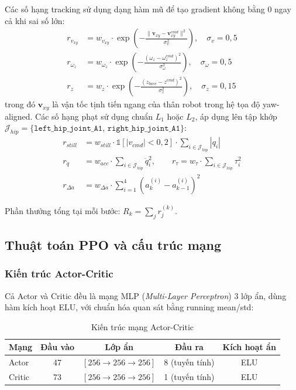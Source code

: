 Các số hạng tracking sử dụng dạng hàm mũ để tạo gradient không bằng 0
ngay cả khi sai số lớn:
\begin{align}
    r_{v_{xy}} &= w_{v_{xy}} \cdot
        \exp\!\left(-\frac{\|\mathbf{v}_{xy} - \mathbf{v}_{xy}^{cmd}\|^2}{\sigma_{v}^2}\right),
    \quad \sigma_v = 0{,}5
    \label{eq:rew_linvel} \\
    r_{\omega_z} &= w_{\omega_z} \cdot
        \exp\!\left(-\frac{(\omega_z - \omega_z^{cmd})^2}{\sigma_\omega^2}\right),
    \quad \sigma_\omega = 0{,}5
    \label{eq:rew_angvel} \\
    r_{z} &= w_z \cdot
        \exp\!\left(-\frac{(z_{base} - z^{cmd})^2}{\sigma_z^2}\right),
    \quad \sigma_z = 0{,}15
    \label{eq:rew_height}
\end{align}
trong đó $\mathbf{v}_{xy}$ là vận tốc tịnh tiến ngang của thân robot trong
hệ tọa độ yaw-aligned. Các số hạng phạt sử dụng chuẩn $L_1$ hoặc $L_2$, áp dụng lên tập khớp
$\mathcal{J}_{hip} = \{\texttt{left\_hip\_joint\_A1},\,\texttt{right\_hip\_joint\_A1}\}$:
\begin{align}
    r_{still}    &= w_{still} \cdot
        \mathbb{1}[|v_{cmd}| < 0{,}2]\cdot
        \sum_{i \in \mathcal{J}_{hip}} |q_i|
    \label{eq:rew_still} \\
    r_{\ddot{q}} &= w_{acc} \cdot \sum_{i \in \mathcal{J}_{hip}} \ddot{q}_i^2,
    \qquad
    r_{\tau}     = w_{\tau} \cdot \sum_{i \in \mathcal{J}_{hip}} \tau_i^2
    \label{eq:rew_acc_torque} \\
    r_{\Delta a} &= w_{\Delta a} \cdot \sum_{i=1}^{4}(a_k^{(i)} - a_{k-1}^{(i)})^2
    \label{eq:rew_action_rate}
\end{align}

Phần thưởng tổng tại mỗi bước: $R_k = \sum_j r_j^{(k)}$.

\subsection{Thuật toán PPO và cấu trúc mạng}

\subsubsection{Kiến trúc Actor-Critic}

Cả Actor và Critic đều là mạng MLP (\textit{Multi-Layer Perceptron}) 3 lớp
ẩn, dùng hàm kích hoạt ELU, với chuẩn hóa quan sát bằng running mean/std:

\begin{table}[H]
    \centering
    \caption{Kiến trúc mạng Actor-Critic}
    \label{tab:network_arch}
    \renewcommand{\arraystretch}{1.3}
    \begin{tabular}{|l|c|c|c|c|}
    \hline
    \textbf{Mạng} & \textbf{Đầu vào} & \textbf{Lớp ẩn} & \textbf{Đầu ra} & \textbf{Kích hoạt ẩn} \\
    \hline
    Actor  & 47  & $[256 \to 256 \to 256]$ & 8 (tuyến tính) & ELU \\
    Critic & 73  & $[256 \to 256 \to 256]$ & 1 (tuyến tính) & ELU \\
    \hline
    \end{tabular}
\end{table}

